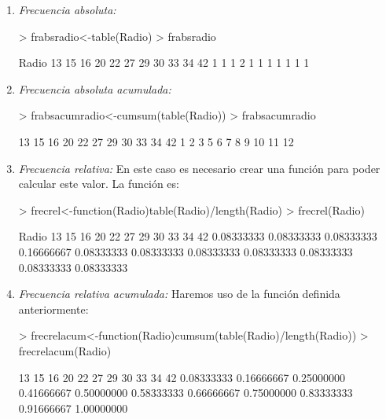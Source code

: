 \documentclass [a4paper] {article}
\begin{document}
\begin{enumerate}
\item
\textit{Frecuencia absoluta: }
\begin{Schunk}
\begin{Sinput}
> frabsradio<-table(Radio)
> frabsradio
\end{Sinput}
\begin{Soutput}
Radio
13 15 16 20 22 27 29 30 33 34 42 
 1  1  1  2  1  1  1  1  1  1  1 
\end{Soutput}
\end{Schunk}

\item
\textit{Frecuencia absoluta acumulada: }
\begin{Schunk}
\begin{Sinput}
> frabsacumradio<-cumsum(table(Radio))
> frabsacumradio
\end{Sinput}
\begin{Soutput}
13 15 16 20 22 27 29 30 33 34 42 
 1  2  3  5  6  7  8  9 10 11 12 
\end{Soutput}
\end{Schunk}

\item
\textit{Frecuencia relativa: }En este caso es necesario crear una funci\'on
para poder calcular este valor. La funci\'on es:
\begin{Schunk}
\begin{Sinput}
> frecrel<-function(Radio){table(Radio)/length(Radio)}
> frecrel(Radio)
\end{Sinput}
\begin{Soutput}
Radio
        13         15         16         20         22         27         29         30         33         34         42 
0.08333333 0.08333333 0.08333333 0.16666667 0.08333333 0.08333333 0.08333333 0.08333333 0.08333333 0.08333333 0.08333333 
\end{Soutput}
\end{Schunk}

\item
\textit{Frecuencia relativa acumulada: }Haremos uso de la funci\'on definida anteriormente:
\begin{Schunk}
\begin{Sinput}
> frecrelacum<-function(Radio){cumsum(table(Radio)/length(Radio))}
> frecrelacum(Radio)
\end{Sinput}
\begin{Soutput}
        13         15         16         20         22         27         29         30         33         34         42 
0.08333333 0.16666667 0.25000000 0.41666667 0.50000000 0.58333333 0.66666667 0.75000000 0.83333333 0.91666667 1.00000000 
\end{Soutput}
\end{Schunk}
\end{enumerate}
\end{document}

